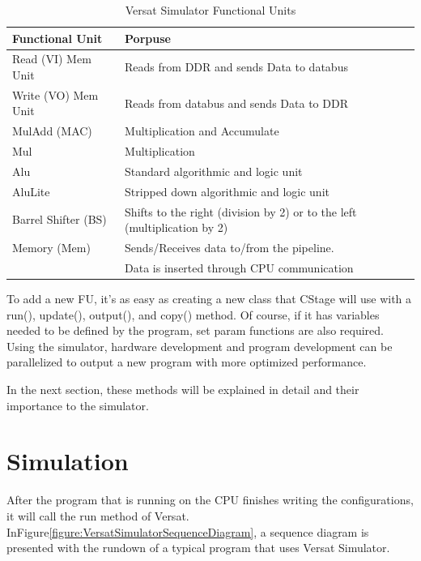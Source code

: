 \begin{table}[!htbp]
    \centering
    \begin{tabular}{|ll|}
        \hline
        \textbf{Functional Unit}     & \textbf{Porpuse}  \\  \hline
        Read (VI) Mem Unit             & Reads from DDR and sends Data to databus            \\ \hline
        Write (VO) Mem Unit & Reads from databus and sends Data to DDR             \\ \hline
        MulAdd (MAC)    & Multiplication and Accumulate          \\ \hline
		Mul    & Multiplication     \\ \hline
		Alu    & Standard algorithmic and logic unit     \\ \hline
		AluLite    & Stripped down  algorithmic and logic unit     \\ \hline
		Barrel Shifter (BS) & Shifts to the right (division by 2) or to the left (multiplication by 2) \\ \hline
		Memory (Mem) & Sends/Receives data to/from the pipeline. \\ & Data is inserted through CPU communication   \\ \hline
        \end{tabular}
    \caption{Versat Simulator Functional Units}
    \label{table:versatsimfu}
    \end{table}

To add a new FU, it's as easy as creating a new class that CStage will use with
a run(), update(), output(), and copy() method. Of course, if it has variables needed to be defined
by the program, set param functions are also required. Using the simulator, hardware development
and program development can be parallelized to output a new program 
with more optimized performance.

In the next section, these methods will be explained in detail and 
their importance to the simulator.

\section{Simulation}

After the program that is running on the CPU finishes writing the configurations, it will call the run method of Versat.
InFigure\ref{figure:VersatSimulatorSequenceDiagram}, a sequence diagram is presented with the rundown
of a typical program that uses Versat Simulator.


